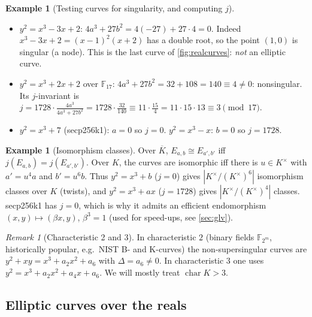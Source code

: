 \documentclass[11pt,a4paper,oneside]{book}
\theoremstyle{plain}
\theoremstyle{definition}
\newtheorem{example}[theorem]{Example}
\theoremstyle{remark}
\newtheorem{remark}[theorem]{Remark}
\newcommand{\F}{\mathbb{F}}
\newcommand{\Kbar}{\overline{K}}
\begin{document}
\begin{example}[Testing curves for singularity, and computing $j$]\label{ex:singtest}
\begin{itemize}[nosep]
\item $y^2=x^3-3x+2$: $4a^3+27b^2=4(-27)+27\cdot4=0$. Indeed $x^3-3x+2=(x-1)^2(x+2)$ has a double root, so the point $(1,0)$ is singular (a node). This is the last curve of \cref{fig:realcurves}: \emph{not} an elliptic curve.
\item $y^2=x^3+2x+2$ over $\F_{17}$: $4a^3+27b^2=32+108=140\equiv4\ne0$: nonsingular. Its $j$-invariant is $j=1728\cdot\frac{4a^3}{4a^3+27b^2}=1728\cdot\frac{32}{140}\equiv11\cdot\frac{15}{4}=11\cdot15\cdot13\equiv3\pmod{17}$.
\item $y^2=x^3+7$ (secp256k1): $a=0$ so $j=0$. $y^2=x^3-x$: $b=0$ so $j=1728$.
\end{itemize}
\end{example}

\begin{example}[Isomorphism classes]
Over $\Kbar$, $E_{a,b}\cong E_{a',b'}$ iff $j(E_{a,b})=j(E_{a',b'})$. Over $K$, the curves are isomorphic iff there is $u\in K^\times$ with $a'=u^4a$ and $b'=u^6b$. Thus
$y^2=x^3+b$ ($j=0$) gives $|K^\times/(K^\times)^6|$ isomorphism classes over $K$ (twists), and $y^2=x^3+ax$ ($j=1728$) gives $|K^\times/(K^\times)^4|$ classes.
secp256k1 has $j=0$, which is why it admits an efficient endomorphism $(x,y)\mapsto(\beta x,y)$, $\beta^3=1$ (used for speed-ups, see \cref{sec:glv}).
\end{example}

\begin{remark}[Characteristic 2 and 3]
In characteristic $2$ (binary fields $\F_{2^m}$, historically popular, e.g.\ NIST B- and K-curves) the non-supersingular curves are
$y^2+xy=x^3+a_2x^2+a_6$ with $\Delta=a_6\ne0$. In characteristic $3$ one uses $y^2=x^3+a_2x^2+a_4x+a_6$. We will mostly treat $\operatorname{char}K>3$.
\end{remark}

\subsection{Elliptic curves over the reals}
\end{document}
